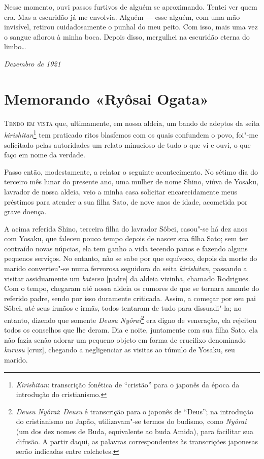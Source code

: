 Nesse momento, ouvi passos furtivos de alguém se aproximando. Tentei
ver quem era. Mas a escuridão já me envolvia. Alguém --- esse alguém, com
uma mão invisível, retirou cuidadosamente o punhal do meu peito. Com
isso, mais uma vez o sangue aflorou à minha boca. Depois disso,
mergulhei na escuridão eterna do limbo\ldots{}

\begin{flushright}
\textit{Dezembro de 1921}\\  
\end{flushright}


\chapter[Memorando «Ryôsai Ogata»]{Memorando «Ryôsai Ogata»}

\noindent\textsc{Tendo em vista} que, ultimamente, em nossa aldeia, um bando de adeptos da
seita \textit{kirishitan}\footnote{ \textit{Kirishitan}: transcrição
fonética de ``cristão'' para o japonês da época da
introdução do cristianismo.} tem praticado ritos blasfemos com os quais 
confundem o povo, foi"-me solicitado pelas autoridades um
relato minucioso de tudo o que vi e ouvi, o que faço em nome da verdade.

Passo então, modestamente, a relatar o seguinte acontecimento. No sétimo
dia do terceiro mês lunar do presente ano, uma mulher de nome Shino,
viúva de Yosaku, lavrador de nossa aldeia, veio a minha casa solicitar
encarecidamente meus préstimos para atender a sua filha Sato, de nove
anos de idade, acometida por grave doença.

A acima referida Shino, terceira filha do lavrador Sôbei, casou"-se há
dez anos com Yosaku, que faleceu pouco tempo depois de nascer sua filha
Sato; sem ter contraído novas núpcias, ela tem ganho a vida tecendo
panos e fazendo alguns pequenos serviços. No entanto, não se sabe por
que equívoco, depois da morte do marido converteu"-se numa fervorosa
seguidora da seita \textit{kirishitan}, passando a visitar assiduamente
um \textit{bateren} [padre] da aldeia
vizinha, chamado Rodrigues. Com o tempo, chegaram até nossa aldeia os
rumores de que se tornara amante do referido padre, sendo por isso
duramente criticada. Assim, a começar por seu pai Sôbei, até seus
irmãos e irmãs, todos tentaram de tudo para dissuadi"-la; no entanto,
dizendo que somente \textit{Deusu Nyôrai}\footnote{ \textit{Deusu 
Nyôrai}: \textit{Deusu} é transcrição para o japonês de ``Deus''; na
introdução do cristianismo no Japão, utilizavam"-se termos do budismo,
como \textit{Nyôrai} (um dos dez nomes de Buda, equivalente ao buda
Amida), para facilitar sua difusão. A partir daqui, as palavras 
correspondentes às transcrições japonesas serão indicadas entre colchetes.} 
era digno de veneração,
ela rejeitou todos os conselhos que lhe deram. Dia e noite, juntamente
com sua filha Sato, ela não fazia senão adorar um pequeno objeto em
forma de crucifixo denominado \textit{kurusu} [cruz], 
chegando a negligenciar as visitas ao túmulo de Yosaku, seu marido.

